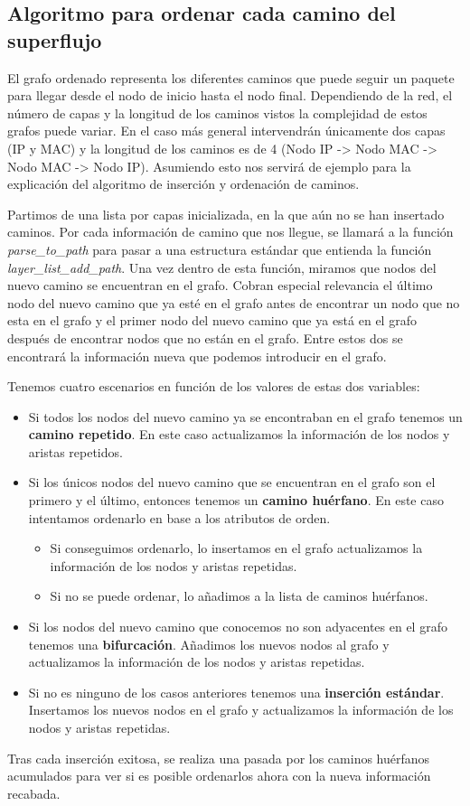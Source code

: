 \documentclass[twoside, 12pt]{epstfg}
\begin{document}
\subsection{Algoritmo para ordenar cada camino del superflujo}
El grafo ordenado representa los diferentes caminos que puede seguir un paquete para llegar desde el nodo de inicio hasta el nodo final. Dependiendo de la red, el número de capas y la longitud de los caminos vistos la complejidad de estos grafos puede variar. En el caso más general intervendrán únicamente dos capas (IP y MAC) y la longitud de los caminos es de 4 (Nodo IP -> Nodo MAC -> Nodo MAC -> Nodo IP). Asumiendo esto nos servirá de ejemplo para la explicación del algoritmo de inserción y ordenación de caminos.

Partimos de una lista por capas inicializada, en la que aún no se han insertado caminos. Por cada información de camino que nos llegue, se llamará a la función \textit{parse\_to\_path} para pasar a una estructura estándar que entienda la función \textit{layer\_list\_add\_path}. Una vez dentro de esta función, miramos que nodos del nuevo camino se encuentran en el grafo. Cobran especial relevancia el último nodo del nuevo camino que ya esté en el grafo antes de encontrar un nodo que no esta en el grafo y el primer nodo del nuevo camino que ya está en el grafo después de encontrar nodos  que no están en el grafo. Entre estos dos se encontrará la información nueva que podemos introducir en el grafo.

Tenemos cuatro escenarios en función de los valores de estas dos variables:
\begin{itemize}
    \item Si todos los nodos del nuevo camino ya se encontraban en el grafo tenemos un \textbf{camino repetido}. En este caso actualizamos la información de los nodos y aristas repetidos.
    \item Si los únicos nodos del nuevo camino que se encuentran en el grafo son el primero y el último, entonces tenemos un \textbf{camino huérfano}. En este caso intentamos ordenarlo en base a los atributos de orden.
    \begin{itemize}
        \item Si conseguimos ordenarlo, lo insertamos en el grafo actualizamos la información de los nodos y aristas repetidas.
        \item Si no se puede ordenar, lo añadimos a la lista de caminos huérfanos.
    \end{itemize}
    \item Si los nodos del nuevo camino que conocemos no son adyacentes en el grafo tenemos una \textbf{bifurcación}. Añadimos los nuevos nodos al grafo y actualizamos la información de los nodos y aristas repetidas.
    \item Si no es ninguno de los casos anteriores tenemos una \textbf{inserción estándar}. Insertamos los nuevos nodos en el grafo y actualizamos la información de los nodos y aristas repetidas.
\end{itemize}
Tras cada inserción exitosa, se realiza una pasada por los caminos huérfanos acumulados para ver si es posible ordenarlos ahora con la nueva información recabada.
\end{document}
